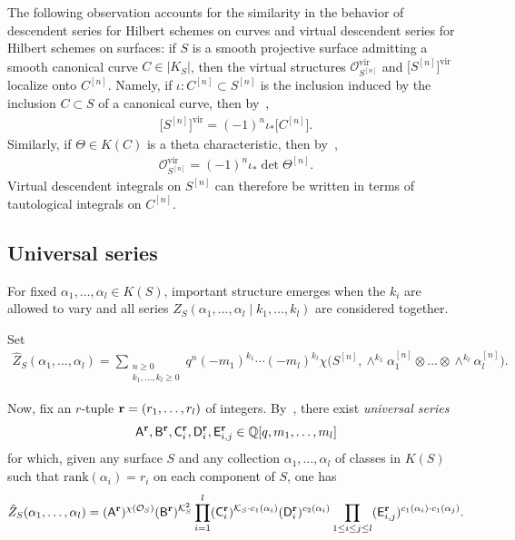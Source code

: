 \documentclass[pdftex]{sigma}
\numberwithin{equation}{section}
\def\O{\mathcal{O}}
\newcommand{\vir}{\mathrm{vir}}
\def\Q{\mathbb Q}
\begin{document}
The following observation accounts for the similarity in the behavior of descendent series for Hilbert schemes on curves and virtual descendent series for Hilbert schemes on surfaces: if $S$ is a smooth projective surface admitting a smooth canonical curve $C\in |K_S|$, then the virtual structures $\O^{\vir}_{S^{[n]}}$ and $\big[S^{[n]}\big]^{\vir}$ localize onto $C^{[n]}$.
Namely, if $\iota\colon C^{[n]}\subset S^{[n]}$ is the inclusion induced by the inclusion $C\subset S$ of a canonical curve, then by~\cite[equation~(33)]{OP},
\begin{gather*}
\big[S^{[n]}\big]^{\vir}=(-1)^{n}\iota_{*} \big[C^{[n]}\big].
\end{gather*}
Similarly, if $\Theta\in K(C)$ is a theta characteristic, then by~\cite[Theorem~15]{AJLOP},
\begin{gather*}
\O^{\vir}_{S^{[n]}}=(-1)^{n} \iota_{*} \det\Theta^{[n]}.
\end{gather*}
Virtual descendent integrals on $S^{[n]}$ can therefore be written in terms of tautological integrals on $C^{[n]}$.



\subsection{Universal series}\label{secuniv}
For fixed $\alpha_1,\dots, \alpha_l\in K(S)$, important structure emerges when the $k_i$ are allowed to vary and all series $Z_S(\alpha_1,\dots ,\alpha_l\mid k_1,\dots,k_l)$ are considered together.

Set
\begin{align}\label{exseries}
\hat{Z}_S( \alpha_1,\dots,\alpha_l)= \sum_{\substack{n\geq 0 \\ k_1,\dots,k_l\geq 0}} q^{n}(-m_1)^{k_1}\cdots (-m_l)^{k_l} \chi\big(S^{[n]}, \wedge^{k_1} \alpha^{[n]}_1 \otimes \dots \otimes \wedge^{k_l} \alpha_l^{[n]} \big).
\end{align}

Now, fix an $r$-tuple ${\bf r}=(r_1,\dots,r_l)$ of integers. By~\cite[Theorem~4.2]{EGL}, there exist {\em universal series}
\begin{gather}\label{univseries}
\mathsf{A}^{\bf{r}}, \mathsf{B}^{\bf{r}}, \mathsf{C}^{\bf{r}}_{i}, \mathsf{D}^{\bf{r}}_{i}, \mathsf{E}^{\bf{r}}_{i,j} \in \Q[q,m_1,\dots,m_l]
\end{gather}
for which, given any surface $S$ and any collection $\alpha_1,\dots,\alpha_l$ of classes in $K(S)$ such that $\mathrm{rank}(\alpha_i)=r_i$ on each component of $S$, one has
\begin{align}\label{univeq}
\hat{Z}_S( \alpha_1,\dots,\alpha_l)=(\mathsf{A}^{\bf{r}})^{\chi(\mathcal{O}_S)} (\mathsf{B}^{\bf{r}})^{\mathcal{K}_S^2}\prod_{i=1}^{l} (\mathsf{C}^{\bf{r}}_i)^{\mathcal{K}_S\cdot c_1(\alpha_i)}(\mathsf{D}^{\bf{r}}_{i})^{c_2(\alpha_i)} \prod_{1\leq i\leq j\leq l} (\mathsf{E}^{\bf{r}}_{i,j} )^{c_1(\alpha_i)\cdot c_1(\alpha_j)}.
\end{align}
\end{document}
